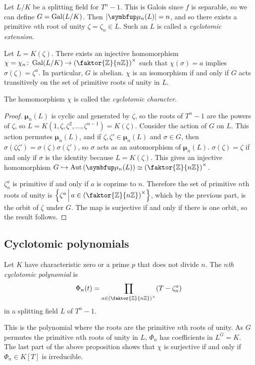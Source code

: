 Let \( L / K \) be a splitting field for \( T^n - 1 \).
This is Galois since \( f \) is separable, so we can define \( G = \operatorname{Gal}(L/K) \).
Then \( \abs{\bm \mu_n(L)} = n \), and so there exists a primitive \( n \)th root of unity \( \zeta = \zeta_n \in L \).
Such an \( L \) is called a \emph{cyclotomic extension}.
\begin{proposition}
	Let \( L = K(\zeta) \).
	There exists an injective homomorphism \( \chi = \chi_n \colon \Gal(L/K) \to \qty(\faktor{\mathbb Z}{n\mathbb Z})^\times \) such that \( \chi(\sigma) = a \) implies \( \sigma(\zeta) = \zeta^a \).
	In particular, \( G \) is abelian.
	\( \chi \) is an isomorphism if and only if \( G \) acts transitively on the set of primitive roots of unity in \( L \).
\end{proposition}
The homomorphism \( \chi \) is called the \emph{cyclotomic character}.
\begin{proof}
	\( \bm \mu_n(L) \) is cyclic and generated by \( \zeta \), so the roots of \( T^n - 1 \) are the powers of \( \zeta \), so \( L = K(1,\zeta,\zeta^2,\dots,\zeta^{n-1}) = K(\zeta) \).
	Consider the action of \( G \) on \( L \).
	This action permutes \( \bm \mu_n(L) \), and if \( \zeta, \zeta' \in \bm \mu_n(L) \) and \( \sigma \in G \), then \( \sigma(\zeta\zeta') = \sigma(\zeta)\sigma(\zeta') \), so \( \sigma \) acts as an automorphism of \( \bm \mu_n(L) \).
	\( \sigma(\zeta) = \zeta \) if and only if \( \sigma \) is the identity because \( L = K(\zeta) \).
	This gives an injective homomorphism \( G \hookrightarrow \Aut \qty(\bm \mu_n(L)) \simeq \qty(\faktor{\mathbb Z}{n\mathbb Z})^\times \).

	\( \zeta_n^a \) is primitive if and only if \( a \) is coprime to \( n \).
	Therefore the set of primitive \( n \)th roots of unity is \( \qty{\zeta^a \midd a \in \qty(\faktor{\mathbb Z}{n\mathbb Z})^\times} \), which by the previous part, is the orbit of \( \zeta \) under \( G \).
	The map is surjective if and only if there is one orbit, so the result follows.
\end{proof}

\subsection{Cyclotomic polynomials}
\begin{definition}
	Let \( K \) have characteristic zero or a prime \( p \) that does not divide \( n \).
	The \emph{\( n \)th cyclotomic polynomial} is
	\[ \Phi_n(t) = \prod_{a \in \qty(\faktor{\mathbb Z}{n\mathbb Z})^\times} (T - \zeta_n^a) \]
	in a splitting field \( L \) of \( T^n - 1 \).
\end{definition}
This is the polynomial where the roots are the primitive \( n \)th roots of unity.
As \( G \) permutes the primitive \( n \)th roots of unity in \( L \), \( \Phi_n \) has coefficients in \( L^G = K \).
The last part of the above proposition shows that \( \chi \) is surjective if and only if \( \Phi_n \in K[T] \) is irreducible.

